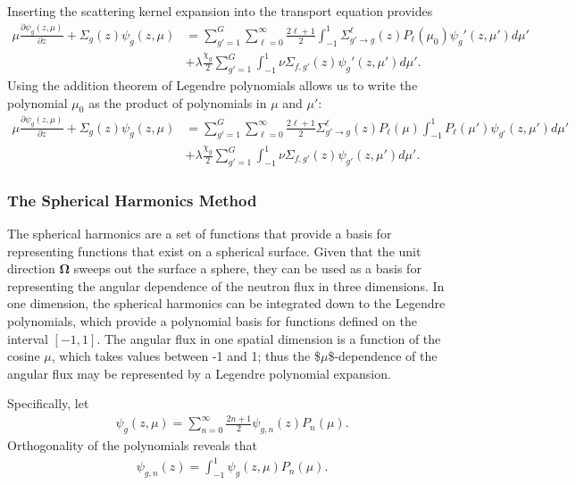\documentclass[11pt]{article}
\renewcommand\vec{\mathbf}
\begin{document}
Inserting the scattering kernel expansion into the transport equation provides
\begin{align}
  \mu \frac{\partial \psi_g(z,\mu)}{\partial z}
  + \Sigma_g(z) \psi_g(z,\mu)
  &= \sum_{g'=1}^G \sum_{\ell=0}^\infty \frac{2\ell+1}{2} \int_{-1}^1 \Sigma_{g' \rightarrow g}^\ell(z) P_\ell(\mu_0) \psi_g'(z,\mu') d\mu' \\
  &+ \lambda\frac{\chi_g}{2} \sum_{g'=1}^G \int_{-1}^1 \nu\Sigma_{f,g'}(z) \psi_g'(z,\mu') d\mu'.
\end{align}
Using the addition theorem of Legendre polynomials allows us to write the polynomial \(\mu_0\) as the product of polynomials in \(\mu\) and \(\mu'\):
\begin{align}
  \mu \frac{\partial \psi_g(z,\mu)}{\partial z}
  + \Sigma_g(z) \psi_g(z,\mu)
  &= \sum_{g'=1}^G \sum_{\ell=0}^\infty \frac{2\ell+1}{2} \Sigma_{g' \rightarrow g}^\ell(z) P_\ell(\mu) \int_{-1}^1 P_\ell(\mu') \psi_{g'}(z,\mu') d\mu' \\
  &+ \lambda\frac{\chi_g}{2} \sum_{g'=1}^G \int_{-1}^1 \nu\Sigma_{f,g'}(z) \psi_{g'}(z,\mu') d\mu'.
  \label{eq::1dTransportWithScatteringExpansion}
\end{align}

\subsubsection{The Spherical Harmonics Method}
\label{sec:orgheadline53}
The spherical harmonics are a set of functions that provide a basis for representing functions that exist on a spherical surface.  Given that the unit direction \(\vec{\Omega}\) sweeps out the surface a sphere, they can be used as a basis for representing the angular dependence of the neutron flux in three dimensions.  In one dimension, the spherical harmonics can be integrated down to the Legendre polynomials, which provide a polynomial basis for functions defined on the interval \([-1,1]\).  The angular flux in one spatial dimension is a function of the cosine \(\mu\), which takes values between -1 and 1; thus the \$\(\mu\)\$-dependence of the angular flux may be represented by a Legendre polynomial expansion.

Specifically, let
\begin{align}
  \psi_g(z,\mu) = \sum_{n=0}^\infty \frac{2n+1}{2} \psi_{g,n}(z) P_n(\mu).
\end{align}
Orthogonality of the polynomials reveals that
\begin{align}
  \psi_{g,n}(z) = \int_{-1}^1 \psi_g(z,\mu) P_n(\mu).
\end{align}
\end{document}
